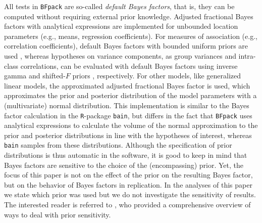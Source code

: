 \documentclass[11pt,reqno]{article}
\begin{document}
All tests in \texttt{BFpack} are so-called \textit{default Bayes factors}, that is, they can be computed without requiring external prior knowledge.
Adjusted fractional Bayes factors with analytical expressions \citep[AFBF;][]{mulder_gu_bayesian_2021, mulder_simple_2019} are implemented for unbounded location parameters (e.g., means, regression coefficients).
For measures of association (e.g., correlation coefficients), default Bayes factors with bounded uniform priors are used \citep[see][]{mulder_corbf_2023}, whereas hypotheses on variance components, as group variances and intra-class correlations, can be evaluated with default Bayes factors using inverse gamma \citep[][]{boingmessing_variancebf_2017} and shifted-$F$ priors \citep[][]{mulder_fox_intraclassbf_2019}, respectively.
For other models, like generalized linear models, the approximated adjusted fractional Bayes factor \citep[AAFBF;][]{gu_approximated_2018} is used, which approximates the prior and posterior distribution of the model parameters with a (multivariate) normal distribution.
This implementation is similar to the Bayes factor calculation in the \texttt{R}-package \texttt{bain}, but differs in the fact that \texttt{BFpack} uses analytical expressions to calculate the volume of the normal approximation to the prior and posterior distributions in line with the hypotheses of interest, whereas \texttt{bain} samples from these distributions.
Although the specification of prior distributions is thus automatic in the software, it is good to keep in mind that Bayes factors are sensitive to the choice of the (encompassing) prior. Yet, the focus of this paper is not on the effect of the prior on the resulting Bayes factor, but on the behavior of Bayes factors in replication. In the analyses of this paper we state which prior was used but we do not investigate the sensitivity of results. The interested reader is referred to \citet{hoijtink_prior_2021}, who provided a comprehensive overview of ways to deal with prior sensitivity.
\end{document}
